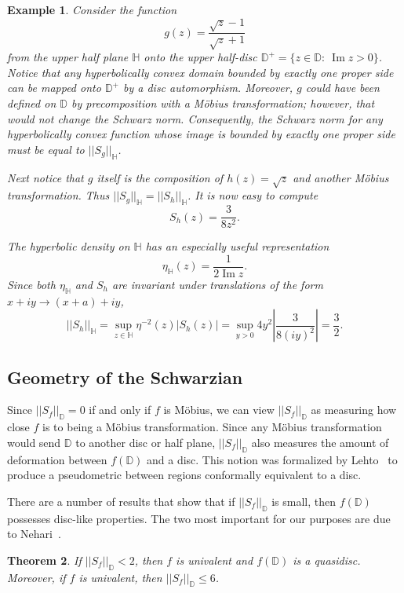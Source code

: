 \documentclass{lms}
\newcommand{\D}{\mathbb D}
\newcommand{\HH}{\mathbb H}
\newcommand{\abs}[1]{\lvert#1\rvert}
\newcommand{\norm}[1]{\lvert\lvert#1\rvert\rvert}
\newcommand{\Snf}{\norm{S_f}_\D}
\newtheorem{theorem}{Theorem}[section]
\newtheorem{example}[theorem]{Example}
\DeclareMathOperator{\im}{Im}
\numberwithin{equation}{section}
\begin{document}
\begin{example}\label{E:one-side}
Consider the function
\[
g(z)=\frac{\sqrt{z}-1}{\sqrt{z}+1}
\]
from the upper half plane $\HH$ onto the upper half-disc 
$\D^+=\{z\in\D:\:\im z>0\}$.  Notice that any hyperbolically convex 
domain bounded by exactly one proper side can be mapped onto $\D^+$ by
a disc automorphism.  Moreover, $g$ could have been defined on $\D$ by
precomposition with a M\"obius transformation; however, that would not
change the Schwarz norm.  Consequently, the Schwarz norm for any hyperbolically
convex function whose image is bounded by exactly one proper side must be equal to 
$\norm{S_g}_\HH$.

Next notice that $g$ itself is the composition of $h(z)=\sqrt{z}$ and another
M\"obius transformation.  Thus $\norm{S_g}_\HH=\norm{S_h}_\HH$.  It is 
now easy to compute
\[
S_h(z)=\frac{3}{8z^2}.
\]

The hyperbolic density on $\HH$ has an especially useful representation 
\[
\eta_\HH(z)=\frac{1}{2\im z}.
\]
Since both $\eta_\HH$ and $S_h$ are invariant under translations of the form $x + iy \rightarrow (x+a) + iy$, 
\[
\norm{S_h}_\HH=\sup_{z\in\HH} \eta^{-2}(z)\abs{S_h(z)} 
=\sup_{y>0} 4y^2\left|\frac{3}{8(iy)^2}\right| = \frac{3}{2}.
\]


\end{example}




\subsection{Geometry of the Schwarzian}

Since $\Snf=0$ if and only if $f$ is M\"obius, we can view 
$\Snf$ as measuring how close $f$ is to being a M\"obius transformation.
Since any M\"obius transformation would send $\D$ to another disc or half plane, 
$\Snf$ also measures the amount of deformation between $f(\D)$
and a disc.  This notion
was formalized by Lehto~\cite{oL87} 
to produce a pseudometric between regions conformally equivalent to a disc.

There are a number of results that show that if $\norm{S_f}_\D$ is small,
then $f(\D)$ possesses disc-like properties.  The two most important
for our purposes are due to Nehari~\cite{zN49,zN76}.

\begin{theorem}  If $\Snf<2$, then $f$ is univalent and $f(\D)$ is a quasidisc.
Moreover, if $f$ is univalent, then $\Snf\leq 6$.
\end{theorem}
\end{document}

